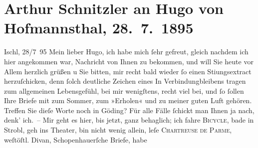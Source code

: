 

               \section[Arthur Schnitzler an Hugo von Hofmannsthal, 28. 7. 1895]{ Arthur Schnitzler an Hugo von Hofmannsthal, 28. 7. 1895}\nopagebreak{}\rehead{ }\begin{ledgroupsized}[t]{13cm}\normalsize\beginnumbering{} \toendnotes[C]{\smallbreak\pagebreak[2]} 
\toendnotes[C]{\smallbreak}\pstart
           \raggedleft{}{\pb}Ischl, 28/7 95\pend
           \pstart
           Mein lieber Hugo, ich habe mich ſehr gefreut, gleich nachdem ich
               hier angekommen war, Nachricht von Ihnen zu bekommen, und will Sie heute vor Allem
               herzlich grüßen u Sie bitten, mir recht bald wieder ſo einen Sti{\geminationm}ungsextract herzuſchicken, denn ſolch deutliche Zeichen
               eines In Verbindungbleibens tragen zum allgemeinen Lebensgefühl, bei mir wenigſtens,
               recht viel bei, und ſo ſollen {\pb}Ihre Briefe mit zum
               Sommer, zum »Erholen« und zu meiner guten Luft gehören. Treffen Sie dieſe Worte noch
               in Göding? Für alle Fälle ſchickt man Ihnen ja
               nach, denk’ ich. – Mir geht es hier, bis jetzt, ganz behaglich; ich fahre \textsc{Bicycle}, bade in Strobl,
               geh ins Theater, bin nicht wenig allein, leſe \textsc{Chartreuse de Parme}, weſtöſtl. Divan, Schopenhauerſche Briefe, habe

\end{ledgroupsized}
